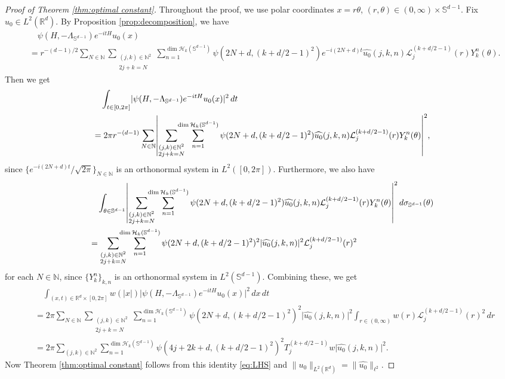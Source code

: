 \documentclass[reqno]{amsart}
\theoremstyle{plain}
\numberwithin{equation}{section}
\theoremstyle{remark}
\newcommand{\R}{\mathbb{R}}
\newcommand{\N}{\mathbb{N}}
\renewcommand{\S}{\mathbb{S}}
\newcommand{\intervaloo}[2]{(#1, #2)}
\newcommand{\intervalcc}[2]{[#1, #2]}
\newcommand{\sumn}{\sum_{n=1}^{\dim \HPk{k}(\S^{d-1})}}
\newcommand{\sumjk}{\sum_{\substack{(j, k) \in \N^2 \\ 2j + k = N} } }
\newcommand{\sumjkn}{\sum_{(j, k) \in \N^2} \!\!\!\! \sumn }
\newcommand{\abs}[1]{\lvert#1\rvert}
\newcommand{\Abs}[1]{\mleft \lvert #1 \mright \rvert}
\newcommand{\norm}[1]{\lVert#1\rVert}
\newcommand{\Hamiltonian}{H}
\newcommand{\LambdaS}{\Lambda_{\S^{d-1}}}
\newcommand{\Tjnuf}[3]{T_{#1}^{(#2)}#3}
\newcommand{\LaguerrecalLjnu}[2]{\mathcal{L}_{#1}^{(#2)}}
\newcommand{\Ykn}[2]{Y_{#1}^{#2}}
\newcommand{\HPk}[1]{ \mathcal{H}_{#1} }
\newcommand{\fjkn}[4]{\widehat{#1}(#2, #3, #4)}
\begin{document}
\begin{proof}[Proof of Theorem \ref{thm:optimal constant}]
Throughout the proof, we use polar coordinates $x = r \theta$, $(r, \theta) \in \intervaloo{0}{\infty} \times \S^{d-1}$.
Fix $u_0 \in L^2(\R^d)$. By Proposition \ref{prop:decomposition}, we have
\begin{align}
&\quad \psi(\Hamiltonian, -\LambdaS) e^{- i t \Hamiltonian} u_0(x) \\
&= r^{-(d-1)/2} \sum_{N \in \N} \sumjk \!\!\!\!\!\! \sumn \psi(2N+d, (k+d/2-1)^2) e^{- i (2N+d) t} \fjkn{u_0}{j}{k}{n} \LaguerrecalLjnu{j}{k + d/2 - 1}(r) \Ykn{k}{n}(\theta) .
\end{align}
Then we get
\begin{align}
&\quad \int_{t \in \intervalcc{0}{2\pi}} \abs{ \psi(\Hamiltonian, -\LambdaS) e^{- i t \Hamiltonian} u_0(x) }^2 \, dt \\
&= 2\pi r^{-(d-1)} \sum_{N \in \N} \Abs{ \sumjk \!\!\!\!\!\! \sumn \psi(2N+d, (k+d/2-1)^2) \fjkn{u_0}{j}{k}{n} \LaguerrecalLjnu{j}{k+d/2-1}(r) \Ykn{k}{n}(\theta) }^2 ,
\end{align}
since $\{ e^{-i (2N+d) t} / \sqrt{2\pi} \}_{N \in \N}$ is an orthonormal system in $L^2(\intervalcc{0}{2\pi})$.
Furthermore, we also have
\begin{align}
&\quad \int_{\theta \in \S^{d-1}} \Abs{ \sumjk \!\!\!\!\!\! \sumn \psi(2N+d,(k+d/2-1)^2) \fjkn{u_0}{j}{k}{n} \LaguerrecalLjnu{j}{k+d/2-1}(r) \Ykn{k}{n}(\theta) }^2 \, d\sigma_{\S^{d-1}}(\theta) \\
& = \sumjk \!\!\!\!\!\! \sumn \psi(2N+d, (k+d/2-1)^2)^2 \abs{\fjkn{u_0}{j}{k}{n}}^2 \LaguerrecalLjnu{j}{k+d/2-1}(r)^2
\end{align}
for each $N \in \N$, since $\{ \Ykn{k}{n} \}_{k, n}$ is an orthonormal system in $L^2(\S^{d-1})$.
Combining these, we get
\begin{align}
&\quad \int_{(x, t) \in \R^d \times \intervalcc{0}{2\pi}} w(\abs{x}) \abs{ \psi(\Hamiltonian, - \LambdaS) e^{- i t \Hamiltonian} u_0(x) }^2 \, dx \, dt \\
&= 2\pi \sum_{N \in \N} \sumjk \!\!\!\!\!\! \sumn \psi(2N+d, (k+d/2-1)^2)^2 \abs{\fjkn{u_0}{j}{k}{n}}^2 \int_{r \in \intervaloo{0}{\infty}} w(r) \LaguerrecalLjnu{j}{k+d/2-1}(r)^2 \, dr \\
&= 2\pi \sumjkn \psi(4j+2k+d, (k+d/2-1)^2)^2 \Tjnuf{j}{k+d/2 - 1}{w} \abs{\fjkn{u_0}{j}{k}{n}}^2 .
\label{eq:LHS}
\end{align}
Now Theorem \ref{thm:optimal constant} follows from this identity \eqref{eq:LHS} and $\norm{u_0}_{L^2(\R^d)} = \norm{\widehat{u_0}}_{\ell^2}$. 
\end{proof}
\end{document}
